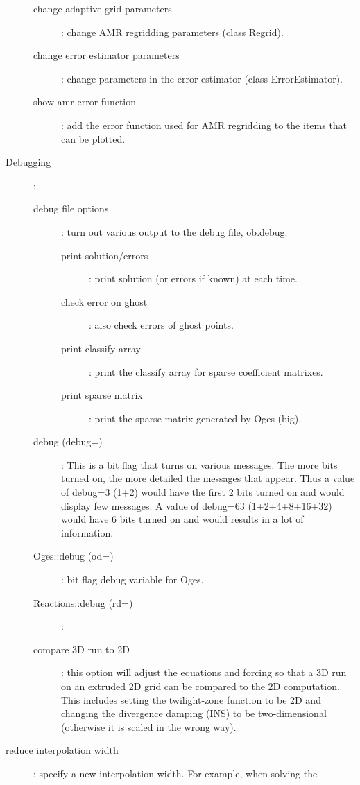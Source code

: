 \begin{description}
\begin{description}
       \item[change adaptive grid parameters] : change AMR regridding parameters (class Regrid).
       \item[change error estimator parameters] : change parameters in the error estimator (class ErrorEstimator).
       \item[show amr error function] : add the error function used for AMR regridding to the items that
         can be plotted.
     \end{description}
  \item[Debugging] :
    \begin{description}
       \item[debug file options] : turn out various output to the debug file, ob.debug.
         \begin{description}
           \item[print solution/errors] : print solution (or errors if known) at each time.
           \item[check error on ghost] : also check errors of ghost points.
           \item[print classify array] : print the classify array for sparse coefficient matrixes.
           \item[print sparse matrix] : print the sparse matrix generated by Oges (big).
        \end{description}
      \item[debug (debug=)] : This is a bit flag that turns on various messages. The more bits turned
        on, the more detailed the messages that appear. Thus a value of debug=3 (1+2) would have the first
        2 bits turned on and would display few messages. A value of debug=63 (1+2+4+8+16+32) would have 6
        bits turned on and would results in a lot of information.
      \item[Oges::debug (od=)] : bit flag debug variable for Oges.
      \item[Reactions::debug (rd=)] :
      \item[compare 3D run to 2D] : this option will adjust the equations and forcing so
         that a 3D run on an extruded 2D grid can be compared to the 2D computation. This includes setting
         the twilight-zone function to be 2D and changing the divergence damping (INS) to be two-dimensional 
         (otherwise it is scaled in the wrong way).
    \end{description}
  \item[reduce interpolation width] : specify a new interpolation width. For example, when solving the

\end{description}
